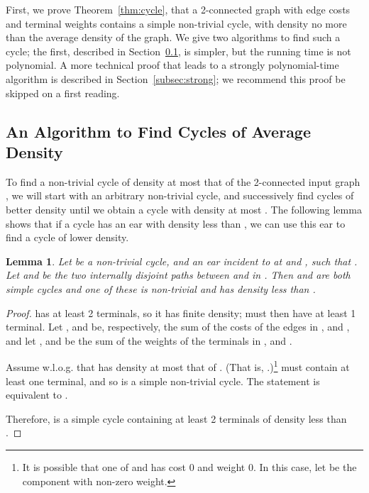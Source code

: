 \documentclass[11pt]{article}
\newtheorem{lemma}{Lemma}[section]
\begin{document}
First, we prove Theorem~\ref{thm:cycle}, that a 2-connected graph with
edge costs and terminal weights contains a simple non-trivial cycle,
with density no more than the average density of the graph. We give
two algorithms to find such a cycle; the first, described in
Section~\ref{subsec:nonPoly}, is simpler, but the running time is not
polynomial.  A more technical proof that leads to a strongly
polynomial-time algorithm is described in Section~\ref{subsec:strong};
we recommend this proof be skipped on a first reading.

\subsection{An Algorithm to Find Cycles of Average
  Density}\label{subsec:nonPoly}

To find a non-trivial cycle of density at most that of the 2-connected
input graph , we will start with an arbitrary non-trivial cycle,
and successively find cycles of better density until we obtain a cycle
with density at most . The following lemma shows that if a
cycle  has an ear with density less than , we can use
this ear to find a cycle of lower density.

\begin{lemma}\label{lem:goodEar}
  Let  be a non-trivial cycle, and  an ear incident to  at
   and , such that . Let  and  be the two internally disjoint paths
  between  and  in . Then  and  are
  both simple cycles and one of these is non-trivial and has density
  less than .
\end{lemma}
\begin{proof}
   has at least 2 terminals, so it has finite density;  must
  then have at least 1 terminal. Let ,  and  be,
  respectively, the sum of the costs of the edges in ,  and
  , and let ,  and  be the sum of the weights of the
  terminals in ,  and .

  Assume w.l.o.g. that  has density at most that of . (That
  is, .)\footnote{It is possible that one of
     and  has cost 0 and weight 0. In this case, let 
    be the component with non-zero weight.}   must contain at
  least one terminal, and so  is a simple non-trivial
  cycle.  The statement  is equivalent
  to .
  \vspace{-0.2in}

  

  \vspace{-0.2in}
  Therefore,  is a simple cycle containing at least 2 terminals of
  density less than .
\end{proof}
\end{document}
